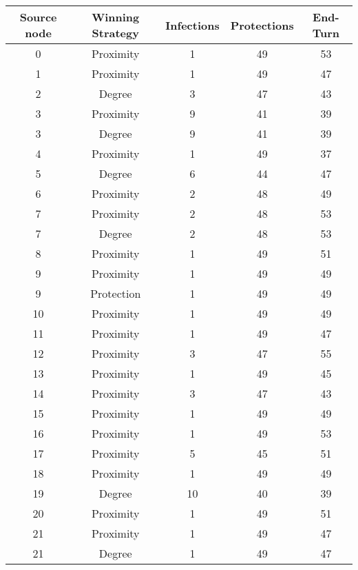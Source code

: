 \documentclass[results.tex]{subfiles}
\begin{document}
\begin{center}
  \begin{tabular}{| c || c | c | c | c |}
    \hline
    {\bfseries Source node} & {\bfseries Winning Strategy} & {\bfseries Infections} & {\bfseries Protections} & {\bfseries End-Turn} \\  %
    \hline\hline
    0 & Proximity & 1 & 49 & 53 \\ 
    \hline
    1 & Proximity & 1 & 49 & 47 \\ 
    \hline
    2 & Degree & 3 & 47 & 43 \\ 
    \hline
    3 & Proximity & 9 & 41 & 39 \\ 
    \hline
    3 & Degree & 9 & 41 & 39 \\ 
    \hline
    4 & Proximity & 1 & 49 & 37 \\ 
    \hline
    5 & Degree & 6 & 44 & 47 \\ 
    \hline
    6 & Proximity & 2 & 48 & 49 \\ 
    \hline
    7 & Proximity & 2 & 48 & 53 \\ 
    \hline
    7 & Degree & 2 & 48 & 53 \\ 
    \hline
    8 & Proximity & 1 & 49 & 51 \\ 
    \hline
    9 & Proximity & 1 & 49 & 49 \\ 
    \hline
    9 & Protection & 1 & 49 & 49 \\ 
    \hline
    10 & Proximity & 1 & 49 & 49 \\ 
    \hline
    11 & Proximity & 1 & 49 & 47 \\ 
    \hline
    12 & Proximity & 3 & 47 & 55 \\ 
    \hline
    13 & Proximity & 1 & 49 & 45 \\ 
    \hline
    14 & Proximity & 3 & 47 & 43 \\ 
    \hline
    15 & Proximity & 1 & 49 & 49 \\ 
    \hline
    16 & Proximity & 1 & 49 & 53 \\ 
    \hline
    17 & Proximity & 5 & 45 & 51 \\ 
    \hline
    18 & Proximity & 1 & 49 & 49 \\ 
    \hline
    19 & Degree & 10 & 40 & 39 \\ 
    \hline
    20 & Proximity & 1 & 49 & 51 \\ 
    \hline
    21 & Proximity & 1 & 49 & 47 \\ 
    \hline
    21 & Degree & 1 & 49 & 47 \\ 
    \hline

\end{tabular}
\end{center}
\end{document}
